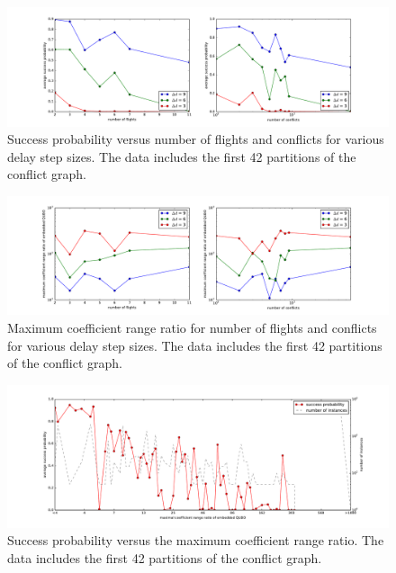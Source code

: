 \documentclass{article}
\begin{document}
\begin{figure}[htpb]
    \centering
    \includegraphics[width=1.0\linewidth]{pics/annealing_results_success_vs_flights_and_conflicts.pdf}
    \caption{Success probability versus number of flights and conflicts for various delay step sizes. The data includes the first 42 partitions of the conflict graph.}
    \label{fig:qa_success_vs_flights_and_conflicts}
\end{figure}

\begin{figure}[htpb]
    \centering
    \includegraphics[width=1.0\linewidth]{pics/annealing_results_coefficent_range_ratio_vs_flights_and_conflicts.pdf}
    \caption{Maximum coefficient range ratio for number of flights and conflicts for various delay step sizes. The data includes the first 42 partitions of the conflict graph.}
    \label{fig:qa_coefficient_range_ratio_vs_flights_and_conflicts}
\end{figure}

\begin{figure}[htpb]
    \centering
    \includegraphics[width=1.0\linewidth]{pics/annealing_results_success_vs_cooefficent_range_ratio.pdf}
    \caption{Success probability versus the maximum coefficient range ratio. The data includes the first 42 partitions of the conflict graph.}
    \label{fig:qa_coefficient_range_ratio_vs_flights_and_conflicts}
\end{figure}
\end{document}
